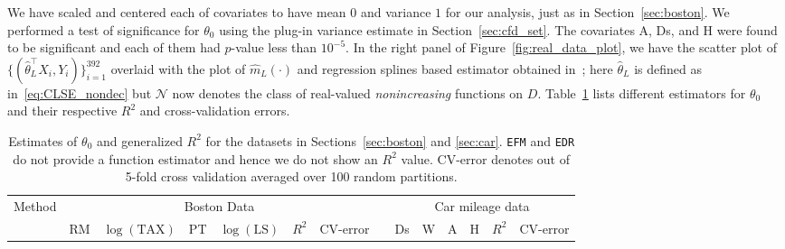 {We have scaled and centered each of covariates to have mean $0$ and variance $1$ for our analysis, just as in Section~\ref{sec:boston}. We performed a test of significance for $\theta_0$ using the plug-in variance estimate in Section~\ref{sec:cfd_set}. The covariates  A, Ds, and  H were found to be significant and each of them had $p$-value less than $10^{-5}$. In the right panel of  Figure~\ref{fig:real_data_plot}, we have the scatter plot of $ \{(\hat{\theta}_L^\top X_i, Y_i)\}_{i=1}^{392}$ overlaid with the plot of $\hat{m}_L(\cdot)$ and regression splines based estimator obtained in~\cite{MR2529970}; here $\hat{\theta}_L$ is defined as in~\eqref{eq:CLSE_nondec} but $\mathcal{N}$ now denotes the class of real-valued \textit{nonincreasing} functions on $D$. Table~\ref{tab:real_dat} lists different estimators for $\theta_0$ and their respective $R^2$ and cross-validation errors.
  \begin{table}[h]
\caption[Estimates of $\theta_0$  and generalized $R^2$ for the datasets in Sections~\ref{sec:boston} and \ref{sec:car}. {\texttt{EFM} and \texttt{EDR} do not provide a function estimator and hence we do not show an $R^2$ value.}]{Estimates of $\theta_0$  and generalized $R^2$ for the datasets in Sections~\ref{sec:boston} and \ref{sec:car}. {\texttt{EFM} and \texttt{EDR} do not provide a function estimator and hence we do not show an $R^2$ value. { CV-error denotes out of  5-fold cross validation averaged over 100 random partitions.} }}\label{tab:real_dat}
\centering
\begin{adjustbox}{max width=\textwidth}

\begin{tabular}{l*{13}{c}}
 \toprule
\multirow{2}{*}{Method} &\multicolumn{6}{c}{Boston Data}& &\multicolumn{6}{c}{Car mileage data}  \bigstrut \\
\cmidrule(rl){2-7} \cmidrule(rl){9-13}
  &RM& $\log(\text{TAX})$ & PT &$\log(\text{LS})$& $R^2$&  CV-error & & Ds & W  &A&H& $R^2$& CV-error \\


\end{tabular}
\end{adjustbox}
\end{table}}

